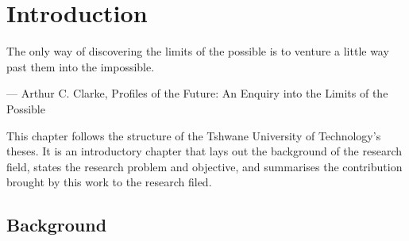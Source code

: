 

\chapter{Introduction}
\label{chap:intro}
\epigraph{The only way of discovering the limits of the possible is to venture a little way past them into the impossible.}{--- \textup{ Arthur C. Clarke}, Profiles of the Future: An Enquiry into the Limits of the Possible}

This chapter follows the structure of the Tshwane University of Technology's theses. It is an introductory chapter that lays out the background of the research field, states the research problem and objective, and summarises the contribution brought by this work to the research filed.   
\section{Background}%

